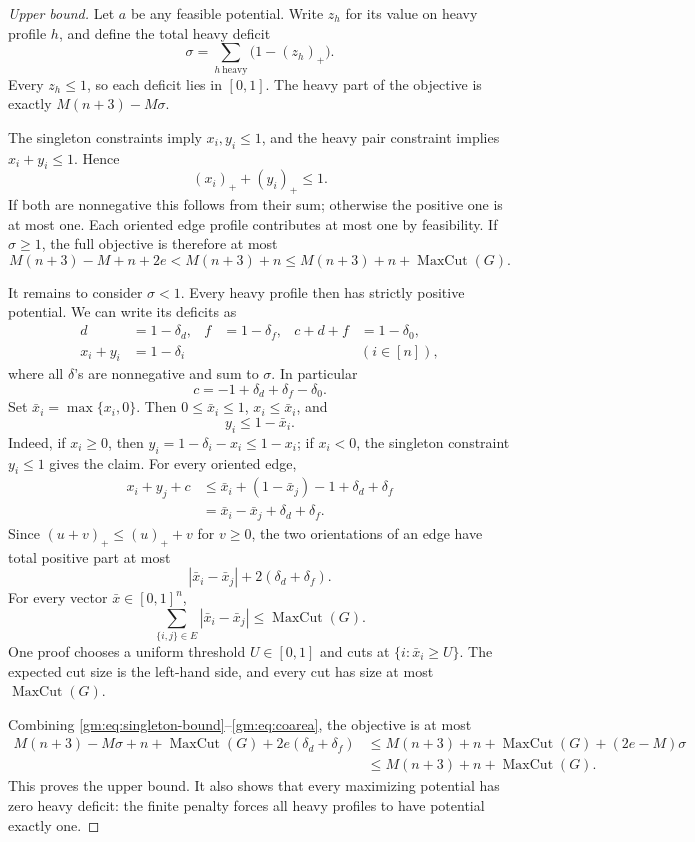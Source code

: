 \begin{proof}[Upper bound]
Let $a$ be any feasible potential. Write $z_h$ for its value on heavy profile $h$, and define the total heavy deficit
\[
\sigma=\sum_{h\ \mathrm{heavy}}\bigl(1-(z_h)_+\bigr).
\]
Every $z_h\le1$, so each deficit lies in $[0,1]$. The heavy part of the objective is exactly $M(n+3)-M\sigma$.

The singleton constraints imply $x_i,y_i\le1$, and the heavy pair constraint implies $x_i+y_i\le1$. Hence
\begin{equation}\label{gm:eq:singleton-bound}
(x_i)_++(y_i)_+\le1.
\end{equation}
If both are nonnegative this follows from their sum; otherwise the positive one is at most one. Each oriented edge profile contributes at most one by feasibility. If $\sigma\ge1$, the full objective is therefore at most
\[
M(n+3)-M+n+2e
<M(n+3)+n\le M(n+3)+n+\operatorname{MaxCut}(G).
\]

It remains to consider $\sigma<1$. Every heavy profile then has strictly positive potential. We can write its deficits as
\begin{align*}
d&=1-\delta_d,& f&=1-\delta_f,& c+d+f&=1-\delta_0,\\
x_i+y_i&=1-\delta_i&&&&(i\in[n]),
\end{align*}
where all $\delta$'s are nonnegative and sum to $\sigma$. In particular
\[
c=-1+\delta_d+\delta_f-\delta_0.
\]
Set $\bar x_i=\max\{x_i,0\}$. Then $0\le\bar x_i\le1$, $x_i\le\bar x_i$, and
\begin{equation}\label{gm:eq:complement-bound}
y_i\le1-\bar x_i.
\end{equation}
Indeed, if $x_i\ge0$, then $y_i=1-\delta_i-x_i\le1-x_i$; if $x_i<0$, the singleton constraint $y_i\le1$ gives the claim. For every oriented edge,
\begin{align*}
x_i+y_j+c
&\le\bar x_i+(1-\bar x_j)-1+\delta_d+\delta_f\\
&=\bar x_i-\bar x_j+\delta_d+\delta_f.
\end{align*}
Since $(u+v)_+\le(u)_++v$ for $v\ge0$, the two orientations of an edge have total positive part at most
\[
|\bar x_i-\bar x_j|+2(\delta_d+\delta_f).
\]
For every vector $\bar x\in[0,1]^n$,
\begin{equation}\label{gm:eq:coarea}
\sum_{\{i,j\}\in E}|\bar x_i-\bar x_j|\le\operatorname{MaxCut}(G).
\end{equation}
One proof chooses a uniform threshold $U\in[0,1]$ and cuts at $\{i:\bar x_i\ge U\}$. The expected cut size is the left-hand side, and every cut has size at most $\operatorname{MaxCut}(G)$.

Combining \eqref{gm:eq:singleton-bound}--\eqref{gm:eq:coarea}, the objective is at most
\begin{align*}
M(n+3)-M\sigma+n+\operatorname{MaxCut}(G)+2e(\delta_d+\delta_f)
&\le M(n+3)+n+\operatorname{MaxCut}(G)+(2e-M)\sigma\\
&\le M(n+3)+n+\operatorname{MaxCut}(G).
\end{align*}
This proves the upper bound. It also shows that every maximizing potential has zero heavy deficit: the finite penalty forces all heavy profiles to have potential exactly one.
\end{proof}

